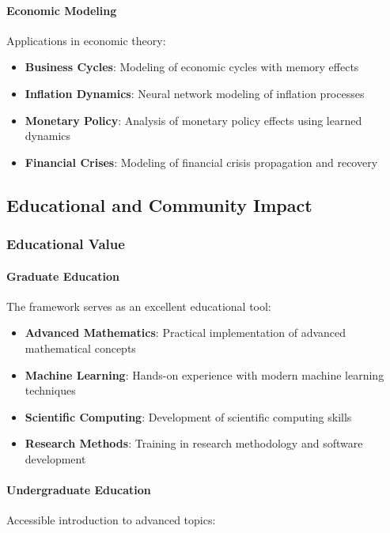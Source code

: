 \paragraph{Economic Modeling}
Applications in economic theory:

\begin{itemize}
    \item \textbf{Business Cycles}: Modeling of economic cycles with memory effects
    \item \textbf{Inflation Dynamics}: Neural network modeling of inflation processes
    \item \textbf{Monetary Policy}: Analysis of monetary policy effects using learned dynamics
    \item \textbf{Financial Crises}: Modeling of financial crisis propagation and recovery
\end{itemize}

\subsection{Educational and Community Impact}

\subsubsection{Educational Value}

\paragraph{Graduate Education}
The framework serves as an excellent educational tool:

\begin{itemize}
    \item \textbf{Advanced Mathematics}: Practical implementation of advanced mathematical concepts
    \item \textbf{Machine Learning}: Hands-on experience with modern machine learning techniques
    \item \textbf{Scientific Computing}: Development of scientific computing skills
    \item \textbf{Research Methods}: Training in research methodology and software development
\end{itemize}

\paragraph{Undergraduate Education}
Accessible introduction to advanced topics:

